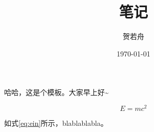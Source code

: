 \documentclass[a4paper,punct,fancyhdr]{ctexart}
\title{笔记}
\author{贺若舟}
\date{\today}
\begin{document}
    \maketitle
	
    哈哈，这是个模板。大家早上好\textasciitilde

    \begin{equation}
        E=mc^2
        \label{eq:ein}
    \end{equation}
    
    如式\ref{eq:ein}所示，blablablabla。
\end{document}
